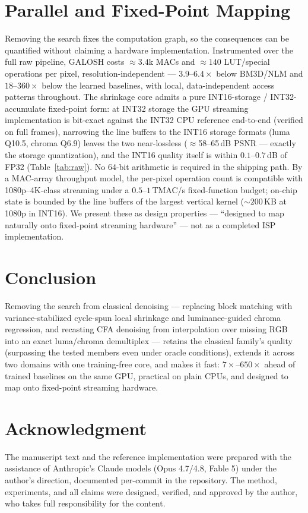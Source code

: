 \documentclass[journal]{IEEEtran}
\begin{document}
\section{Parallel and Fixed-Point Mapping}
Removing the search fixes the computation graph, so the consequences can be
quantified without claiming a hardware implementation. Instrumented over the
full raw pipeline, GALOSH costs ${\approx}3.4$k MACs and ${\approx}140$
LUT/special operations per pixel, resolution-independent ---
$3.9$--$6.4\times$ below BM3D/NLM and $18$--$360\times$ below the learned
baselines, with local, data-independent access patterns throughout. The
shrinkage core admits a pure INT16-storage / INT32-accumulate fixed-point
form: at INT32 storage the GPU streaming implementation is bit-exact against
the INT32 CPU reference end-to-end (verified on full frames), narrowing the
line buffers to the INT16 storage formats (luma Q10.5, chroma Q6.9) leaves the
two near-lossless ($\approx$58--65\,dB PSNR --- exactly the storage
quantization), and the INT16 quality itself is within $0.1$--$0.7$\,dB of
FP32 (Table~\ref{tab:raw}). No 64-bit arithmetic is required in the shipping
path. By a MAC-array throughput model, the per-pixel operation count is
compatible with 1080p--4K-class streaming under a $0.5$--$1$\,TMAC/s
fixed-function budget; on-chip state is bounded by the line buffers of the
largest vertical kernel (${\sim}200$\,KB at 1080p in INT16). We present these
as design properties --- ``designed to map naturally onto fixed-point
streaming hardware'' --- not as a completed ISP implementation.

\section{Conclusion}
Removing the search from classical denoising --- replacing block matching
with variance-stabilized cycle-spun local shrinkage and luminance-guided
chroma regression, and recasting CFA denoising from interpolation over
missing RGB into an exact luma/chroma demultiplex --- retains the
classical family's quality (surpassing the
tested members even under oracle conditions), extends it across two domains
with one training-free core, and makes it fast: $7\times$--$650\times$ ahead
of trained baselines on the same GPU, practical on plain CPUs, and designed
to map onto fixed-point streaming hardware.

\section*{Acknowledgment}
The manuscript text and the reference implementation were prepared with the
assistance of Anthropic's Claude models (Opus 4.7/4.8, Fable 5) under the
author's direction, documented per-commit in the repository. The method,
experiments, and all claims were designed, verified, and approved by the
author, who takes full responsibility for the content.
\end{document}
